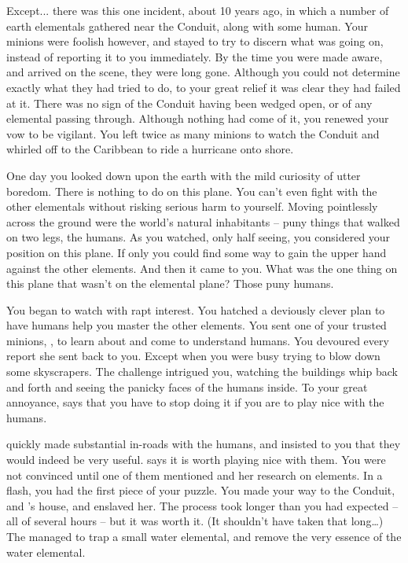 \documentclass[char]{elementals}
\begin{document}
Except... there was this one incident, about 10 years ago, in which a number of earth elementals gathered near the Conduit, along with some human. Your minions were foolish however, and stayed to try to discern what was going on, instead of reporting it to you immediately. By the time you were made aware, and arrived on the scene, they were long gone. Although you could not determine exactly what they had tried to do, to your great relief it was clear they had failed at it. There was no sign of the Conduit having been wedged open, or of any elemental passing through. Although nothing had come of it, you renewed your vow to be vigilant. You left twice as many minions to watch the Conduit and whirled off to the Caribbean to ride a hurricane onto shore.

One day you looked down upon the earth with the mild curiosity of utter boredom. There is nothing to do on this plane. You can't even fight with the other elementals without risking serious harm to yourself. Moving pointlessly across the ground were the world's natural inhabitants -- puny things that walked on two legs, the humans. As you watched, only half seeing, you considered your position on this plane. If only you could find some way to gain the upper hand against the other elements. And then it came to you. What was the one thing on this plane that wasn't on the elemental plane? Those puny humans.

You began to watch with rapt interest. You hatched a deviously clever plan to have humans help you master the other elements. You sent one of your trusted minions, \cNaturalist{\intro}, to learn about and come to understand humans. You devoured every report she sent back to you. Except when you were busy trying to blow down some skyscrapers. The challenge intrigued you, watching the buildings whip back and forth and seeing the panicky faces of the humans inside. To your great annoyance, \cNaturalist{} says that you have to stop doing it if you are to play nice with the humans.

\cNaturalist{} quickly made substantial in-roads with the humans, and insisted to you that they would indeed be very useful. \cNaturalist{\They} says it is worth playing nice with them. You were not convinced until one of them mentioned \cGD{\intro} and her research on elements. In a flash, you had the first piece of your puzzle. You made your way to the Conduit, and \cGD{}'s house, and enslaved her. The process took longer than you had expected -- all of several hours -- but it was worth it. (It shouldn't have taken that long{\ldots}) The \cGD{\kid} managed to trap a small water elemental, and  remove the very essence of the water elemental. 
\end{document}
